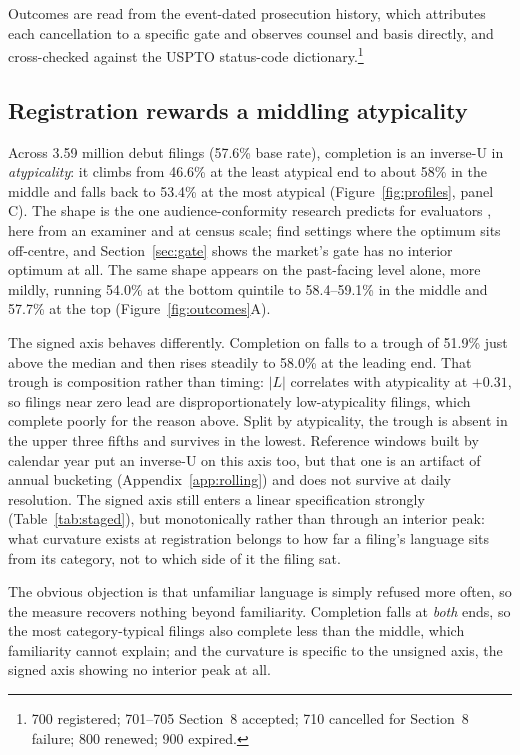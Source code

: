 Outcomes are read from the event-dated prosecution history, which attributes
each cancellation to a specific gate and observes counsel and basis directly,
and cross-checked against the USPTO status-code dictionary.\footnote{700
registered; 701--705 Section~8 accepted; 710 cancelled for Section~8 failure;
800 renewed; 900 expired.}

\subsection{Registration rewards a middling atypicality}\label{sec:registration}

Across 3.59 million debut filings (57.6\% base rate), completion is an
inverse-U in \emph{atypicality}: it climbs from 46.6\% at the least atypical
end to about 58\% in the middle and falls back to 53.4\% at the most atypical
(Figure~\ref{fig:profiles}, panel C). The shape is the one audience-conformity
research predicts for evaluators \citep{Zuckerman1999, Hsu2006, Zhao2017},
here from an examiner and at census scale; \citet{TaeuscherRothe2020} find
settings where the optimum sits off-centre, and Section~\ref{sec:gate} shows
the market's gate has no interior optimum at all. The same shape appears on the
past-facing level alone, more mildly, running 54.0\% at the bottom quintile to
58.4--59.1\% in the middle and 57.7\% at the top (Figure~\ref{fig:outcomes}A).

The signed axis behaves differently. Completion on \dkl{} falls to a trough of
51.9\% just above the median and then rises steadily to 58.0\% at the leading
end. That trough is composition rather than timing: $|L|$ correlates with
atypicality at $+0.31$, so filings near zero lead are disproportionately
low-atypicality filings, which complete poorly for the reason above. Split by
atypicality, the trough is absent in the upper three fifths and survives in
the lowest. Reference windows built by calendar year put an inverse-U on this
axis too, but that one is an artifact of annual bucketing
(Appendix~\ref{app:rolling}) and does not survive at daily resolution. The
signed axis still enters a linear specification strongly
(Table~\ref{tab:staged}), but monotonically rather than through an interior
peak: what curvature exists at registration belongs to how far a filing's
language sits from its category, not to which side of it the filing sat.

The obvious objection is that unfamiliar language is simply refused more
often, so the measure recovers nothing beyond familiarity. Completion falls at
\emph{both} ends, so the most category-typical filings also complete less than
the middle, which familiarity cannot explain; and the curvature is specific to
the unsigned axis, the signed axis showing no interior peak at all.


